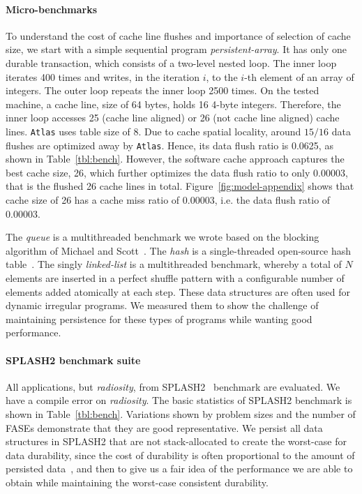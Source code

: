 \documentclass[preprint,nocopyrightspace,10pt]{sigplanconf}
\begin{document}
\paragraph{Micro-benchmarks}
To understand the cost of cache line flushes and importance of selection of cache size, 
we start with a simple sequential program \emph{persistent-array}. It has only one durable
transaction, which consists of a two-level nested loop. The inner loop iterates 400 times and
writes, in the iteration $i$, to the $i$-th element of an array of integers. The outer loop 
repeats the inner loop 2500 times. On the tested machine, a cache line, size of 64 bytes,
holds 16 4-byte integers. Therefore, the inner loop accesses 25 (cache line aligned) or 26 
(not cache line aligned) cache lines. \texttt{Atlas} uses table size of 8. Due to cache spatial 
locality, around $15/16$ data flushes are optimized away by \texttt{Atlas}. Hence, its data 
flush ratio is 0.0625, as shown in Table~\ref{tbl:bench}. However, the software cache approach 
captures the best cache size, 26, which further optimizes the data flush ratio to only 0.00003, 
that is the flushed 26 cache lines in total. Figure~\ref{fig:model-appendix} shows that cache
size of 26 has a cache miss ratio of 0.00003, i.e. the data flush ratio of 0.00003.

The \emph{queue} is a multithreaded benchmark we wrote based on the blocking algorithm
of Michael and Scott~\cite{MichaelS:PODC96}. The \emph{hash} is a single-threaded
open-source hash table~\cite{Clark:2005}. The singly \emph{linked-list} is a multithreaded
benchmark, whereby a total of $N$ elements are inserted in a perfect shuffle pattern
with a configurable number of elements added atomically at each step. These data
structures are often used for dynamic irregular programs. We measured them to show 
the challenge of maintaining persistence for these types of programs while wanting
good performance. 

\paragraph{SPLASH2 benchmark suite}
All applications, but \emph{radiosity}, from SPLASH2~\cite{Woo+:ISCA95} benchmark
are evaluated. We have a compile error on \emph{radiosity}. The basic statistics of
SPLASH2 benchmark is shown in Table~\ref{tbl:bench}. Variations shown by problem
sizes and the number of FASEs demonstrate that they are good representative. 
We persist all data structures in SPLASH2 that are not stack-allocated to create
the worst-case for data durability, since the cost of durability is often proportional 
to the amount of persisted data~\cite{Dhruva+:OOPSLA14}, and then to give us a fair 
idea of the performance we are able to obtain while maintaining the worst-case 
consistent durability.
\end{document}
